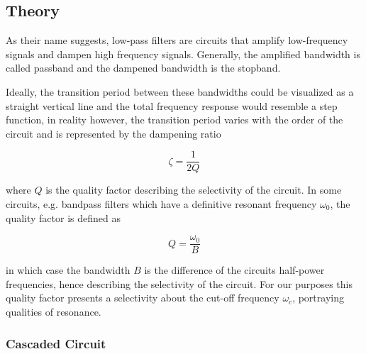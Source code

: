 \documentclass{scrartcl}
\begin{document}
\subsection{Theory}

As their name suggests, low-pass filters are circuits that amplify low-frequency signals and dampen high frequency signals. Generally, the amplified bandwidth is called passband and the dampened bandwidth is the stopband. \newline

Ideally, the transition period between these bandwidths could be visualized as a straight vertical line and the total frequency response would resemble a step function, in reality however, the transition period varies with the order of the circuit and is represented by the dampening ratio

\begin{equation}
    \zeta = \frac{1}{2Q}
\end{equation}

where $Q$ is the quality factor describing the selectivity of the circuit. In some circuits, e.g. bandpass filters which have a definitive resonant frequency $\omega_0$, the quality factor is defined as

\begin{equation}
    Q = \frac{\omega_0}{B}
\end{equation}

in which case the bandwidth $B$ is the difference of the circuits half-power frequencies, hence describing the selectivity of the circuit. For our purposes this quality factor presents a selectivity about the cut-off frequency $\omega_c$, portraying qualities of resonance. 

\subsubsection{Cascaded Circuit}
\end{document}
